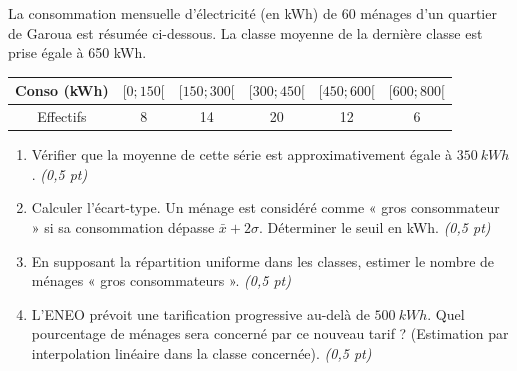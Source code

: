 \documentclass[11pt]{article}
\begin{document}
\begin{exercice}
La consommation mensuelle d'électricité (en kWh) de 60 ménages d'un quartier de Garoua est résumée ci-dessous. La classe moyenne de la dernière classe est prise égale à 650 kWh.
\begin{center}
\begin{tabular}{|c|c|c|c|c|c|}
\hline
Conso (kWh) & $[0; 150[$ & $[150; 300[$ & $[300; 450[$ & $[450; 600[$ & $[600; 800[$ \\ \hline
Effectifs & 8 & 14 & 20 & 12 & 6 \\ \hline
\end{tabular}
\end{center}
\begin{enumerate}
    \item Vérifier que la moyenne de cette série est approximativement égale à $\SI{350}{kWh}$. \textit{(0,5 pt)}
    \item Calculer l'écart-type. Un ménage est considéré comme « gros consommateur » si sa consommation dépasse $\bar{x} + 2\sigma$. Déterminer le seuil en kWh. \textit{(0,5 pt)}
    \item En supposant la répartition uniforme dans les classes, estimer le nombre de ménages « gros consommateurs ». \textit{(0,5 pt)}
    \item L'ENEO prévoit une tarification progressive au-delà de $\SI{500}{kWh}$. Quel pourcentage de ménages sera concerné par ce nouveau tarif ? (Estimation par interpolation linéaire dans la classe concernée). \textit{(0,5 pt)}
\end{enumerate}
\end{exercice}
\end{document}
